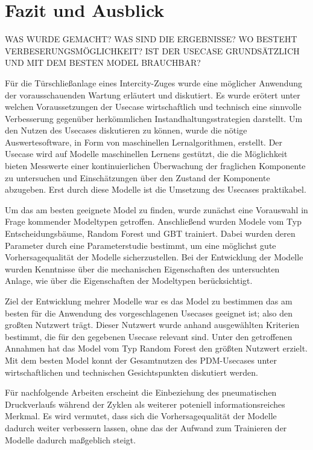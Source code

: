 \chapter{Fazit und Ausblick}
\label{ch:fazit}
WAS WURDE GEMACHT? WAS SIND DIE ERGEBNISSE? WO BESTEHT VERBESERUNGSMÖGLICHKEIT? 
IST DER USECASE GRUNDSÄTZLICH UND MIT DEM BESTEN MODEL BRAUCHBAR?

Für die Türschließanlage eines Intercity-Zuges wurde eine möglicher Anwendung der vorausschauenden Wartung erläutert und diskutiert. Es wurde erötert unter welchen Voraussetzungen der Usecase wirtschaftlich und technisch eine sinnvolle Verbesserung gegenüber herkömmlichen Instandhaltungsstrategien darstellt. Um den Nutzen des Usecases diskutieren zu können, wurde die nötige Auswertesoftware, in Form von maschinellen Lernalgorithmen, erstellt. Der Usecase wird auf Modelle maschinellen Lernens gestützt, die die Möglichkeit bieten Messwerte einer kontinuierlichen Überwachung der fraglichen Komponente zu untersuchen und Einschätzungen über den Zustand der Komponente abzugeben. Erst durch diese Modelle ist die Umsetzung des Usecases praktikabel. 

Um das am besten geeignete Model zu finden, wurde zunächst eine Vorauswahl in Frage kommender Modeltypen getroffen. Anschließend wurden Modele vom Typ Entscheidungsbäume, Random Forest und GBT trainiert. Dabei wurden deren Parameter durch eine Parameterstudie bestimmt, um eine möglichst gute Vorhersagequalität der Modelle sicherzustellen. Bei der Entwicklung der Modelle wurden Kenntnisse über die mechanischen Eigenschaften des untersuchten Anlage, wie über die Eigenschaften der Modeltypen berücksichtigt.

Ziel der Entwicklung mehrer Modelle war es das Model zu bestimmen das am besten für die Anwendung des vorgeschlagenen Usecases geeignet ist; also den großten Nutzwert trägt. Dieser Nutzwert wurde anhand ausgewählten Kriterien bestimmt, die für den gegebenen Usecase relevant sind. Unter den getroffenen Annahmen hat das Model vom Typ Random Forest den größten Nutzwert erzielt. Mit dem besten Model konnt der Gesamtnutzen des PDM-Usecases unter wirtschaftlichen und technischen Gesichtspunkten diskutiert werden.

Für nachfolgende Arbeiten erscheint die Einbeziehung des pneumatischen Druckverlaufs während der Zyklen als weiterer poteniell informationsreiches Merkmal. Es wird vermutet, dass sich die Vorhersagequalität der Modelle dadurch weiter verbessern lassen, ohne das der Aufwand zum Trainieren der Modelle dadurch maßgeblich steigt. 

